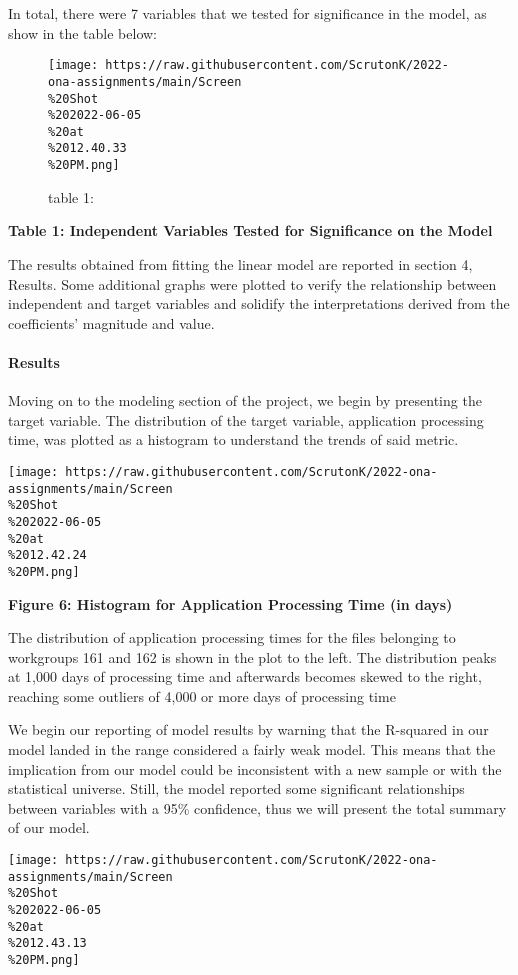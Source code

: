 \documentclass[
]{article}
\begin{document}
In total, there were 7 variables that we tested for significance in the
model, as show in the table below:

\begin{figure}
\centering
\texttt{[image: https://raw.githubusercontent.com/ScrutonK/2022-ona-assignments/main/Screen\\\%20Shot\\\%202022-06-05\\\%20at\\\%2012.40.33\\\%20PM.png]}
\caption{table 1:}
\end{figure}

\textbf{Table 1: Independent Variables Tested for Significance on the
Model}

The results obtained from fitting the linear model are reported in
section 4, Results. Some additional graphs were plotted to verify the
relationship between independent and target variables and solidify the
interpretations derived from the coefficients' magnitude and value.

\hypertarget{results}{%
\paragraph{Results}\label{results}}

Moving on to the modeling section of the project, we begin by presenting
the target variable. The distribution of the target variable,
application processing time, was plotted as a histogram to understand
the trends of said metric.

\texttt{[image: https://raw.githubusercontent.com/ScrutonK/2022-ona-assignments/main/Screen\\\%20Shot\\\%202022-06-05\\\%20at\\\%2012.42.24\\\%20PM.png]}

\textbf{Figure 6: Histogram for Application Processing Time (in days)}

The distribution of application processing times for the files belonging
to workgroups 161 and 162 is shown in the plot to the left. The
distribution peaks at 1,000 days of processing time and afterwards
becomes skewed to the right, reaching some outliers of 4,000 or more
days of processing time

We begin our reporting of model results by warning that the R-squared in
our model landed in the range considered a fairly weak model. This means
that the implication from our model could be inconsistent with a new
sample or with the statistical universe. Still, the model reported some
significant relationships between variables with a 95\% confidence, thus
we will present the total summary of our model.

\texttt{[image: https://raw.githubusercontent.com/ScrutonK/2022-ona-assignments/main/Screen\\\%20Shot\\\%202022-06-05\\\%20at\\\%2012.43.13\\\%20PM.png]}
\end{document}
